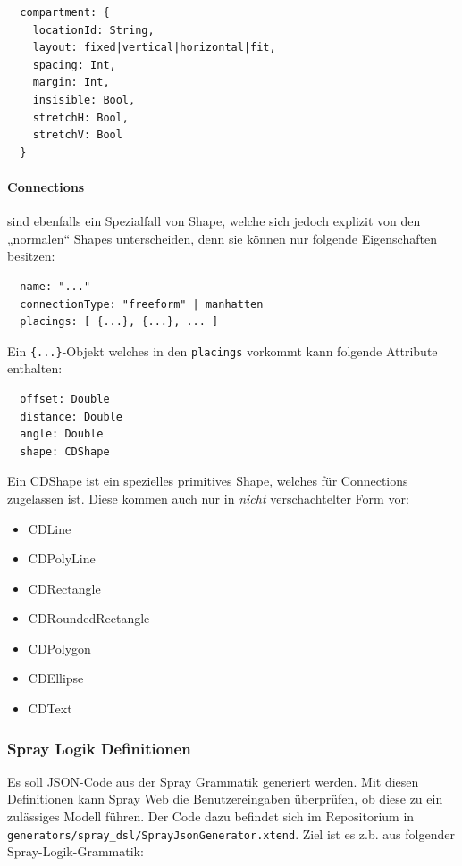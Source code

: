 \begin{verbatim}
  compartment: {
    locationId: String,
    layout: fixed|vertical|horizontal|fit,
    spacing: Int,
    margin: Int,
    insisible: Bool,
    stretchH: Bool,
    stretchV: Bool
  }
\end{verbatim}

\paragraph{Connections} sind ebenfalls ein Spezialfall von Shape,
welche sich jedoch explizit von den „normalen“ Shapes unterscheiden,
denn sie können nur folgende Eigenschaften besitzen:

\begin{verbatim}
  name: "..."
  connectionType: "freeform" | manhatten
  placings: [ {...}, {...}, ... ]
\end{verbatim}

\noindent Ein \verb|{...}|-Objekt welches in den {\tt placings} vorkommt kann folgende
Attribute enthalten:

\begin{verbatim}
  offset: Double
  distance: Double
  angle: Double
  shape: CDShape
\end{verbatim}

\noindent Ein CDShape ist ein spezielles primitives Shape, welches für Connections
zugelassen ist. Diese kommen auch nur in \emph{nicht} verschachtelter Form vor:

\begin{itemize}
  \item CDLine
  \item CDPolyLine
  \item CDRectangle
  \item CDRoundedRectangle
  \item CDPolygon
  \item CDEllipse
  \item CDText
\end{itemize}


\subsubsection{Spray Logik Definitionen}

Es soll JSON-Code aus der Spray Grammatik generiert werden.
Mit diesen Definitionen kann Spray Web die Benutzereingaben überprüfen,
ob diese zu ein zulässiges Modell führen.
Der Code dazu befindet sich im Repositorium in
{\tt generators/spray\_dsl/SprayJsonGenerator.xtend}.
Ziel ist es z.b. aus folgender Spray-Logik-Grammatik:

